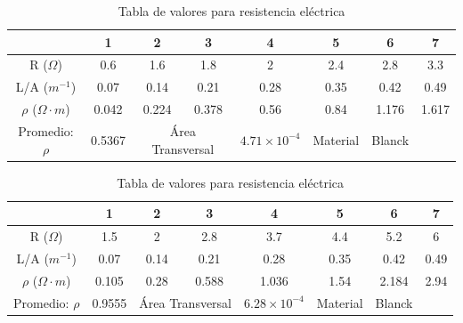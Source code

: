 \documentclass[letterpaper, 12pt]{article}
\begin{document}
\begin{table}[H]
	\centering
	\caption{Tabla de valores para resistencia eléctrica}
	\label{tabla-resistencia 1ra Medicion}
	\begin{tabular}{cccccccc}
		\toprule
		                          & 1      & 2                                    & 3                     & 4        & 5      & 6     & 7     \\
		\midrule
		R ($\Omega$)              & 0.6    & 1.6                                  & 1.8                   & 2        & 2.4    & 2.8   & 3.3   \\
		L/A ($m^{-1}$)            & 0.07   & 0.14                                 & 0.21                  & 0.28     & 0.35   & 0.42  & 0.49  \\
		$\rho$ ($\Omega \cdot m$) & 0.042  & 0.224                                & 0.378                 & 0.56     & 0.84   & 1.176 & 1.617 \\
		Promedio: $\rho$          & 0.5367 & \multicolumn{2}{c}{Área Transversal} & $4.71 \times 10^{-4}$ & Material & Blanck                 \\
		\bottomrule
	\end{tabular}
\end{table}

\begin{table}[H]
	\centering
	\caption{Tabla de valores para resistencia eléctrica}
	\label{tabla-resistencia 2da Medicion}
	\begin{tabular}{cccccccc}
		\toprule
		                          & 1      & 2                                    & 3                     & 4        & 5      & 6     & 7    \\
		\midrule
		R ($\Omega$)              & 1.5    & 2                                    & 2.8                   & 3.7      & 4.4    & 5.2   & 6    \\
		L/A ($m^{-1}$)            & 0.07   & 0.14                                 & 0.21                  & 0.28     & 0.35   & 0.42  & 0.49 \\
		$\rho$ ($\Omega \cdot m$) & 0.105  & 0.28                                 & 0.588                 & 1.036    & 1.54   & 2.184 & 2.94 \\
		Promedio: $\rho$          & 0.9555 & \multicolumn{2}{c}{Área Transversal} & $6.28 \times 10^{-4}$ & Material & Blanck                \\
		\bottomrule
	\end{tabular}
\end{table}
\end{document}
